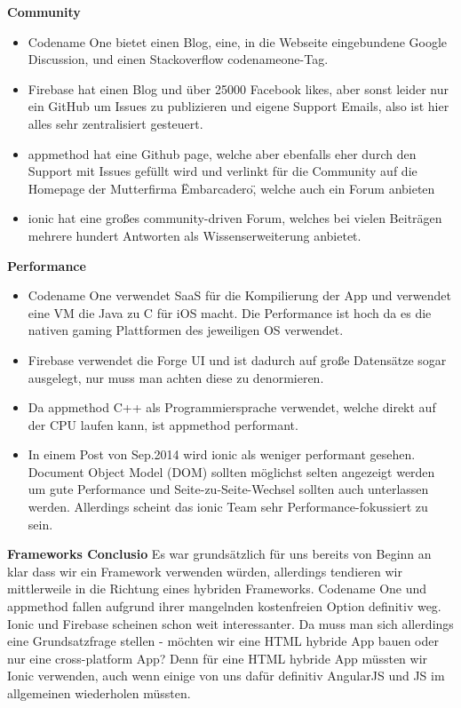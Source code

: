 \textbf{Community}
\begin{itemize}
	\item Codename One bietet einen Blog, eine, in die Webseite eingebundene Google Discussion, und einen Stackoverflow codenameone-Tag.
	\item Firebase hat einen Blog und über 25000 Facebook likes, aber sonst leider nur ein GitHub um Issues zu publizieren und eigene Support Emails, also ist hier alles sehr zentralisiert gesteuert. 
	\item appmethod hat eine Github page, welche aber ebenfalls eher durch den Support mit Issues gefüllt wird und verlinkt für die Community auf die Homepage der Mutterfirma \"Embarcadero\", welche auch ein Forum anbieten
	\item ionic hat eine großes community-driven Forum, welches bei vielen Beiträgen mehrere hundert Antworten als Wissenserweiterung anbietet.
\end{itemize}

\textbf{Performance}
\begin{itemize}
	\item Codename One verwendet SaaS für die Kompilierung der App und verwendet eine VM die Java zu C für iOS macht. Die Performance ist hoch da es die nativen gaming Plattformen des jeweiligen OS verwendet. 
	\item Firebase verwendet die Forge UI und ist dadurch auf große Datensätze sogar ausgelegt, nur muss man achten diese zu denormieren.
	\item Da appmethod C++ als Programmiersprache verwendet, welche direkt auf der CPU laufen kann, ist appmethod performant.
	\item In einem Post von Sep.2014 wird ionic als weniger performant gesehen. Document Object Model (DOM) sollten möglichst selten angezeigt werden um gute Performance und Seite-zu-Seite-Wechsel sollten auch unterlassen werden. Allerdings scheint das ionic Team sehr Performance-fokussiert zu sein.
\end{itemize}

\textbf{Frameworks Conclusio}
Es war grundsätzlich für uns bereits von Beginn an klar dass wir ein Framework verwenden würden, allerdings tendieren wir mittlerweile in die Richtung eines hybriden Frameworks. Codename One und appmethod fallen aufgrund ihrer mangelnden kostenfreien Option definitiv weg. Ionic und Firebase scheinen schon weit interessanter.
Da muss man sich allerdings eine Grundsatzfrage stellen - möchten wir eine HTML hybride App bauen oder nur eine cross-platform App? Denn für eine HTML hybride App müssten wir Ionic verwenden, auch wenn einige von uns dafür definitiv AngularJS und JS im allgemeinen wiederholen müssten.

\clearpage %
